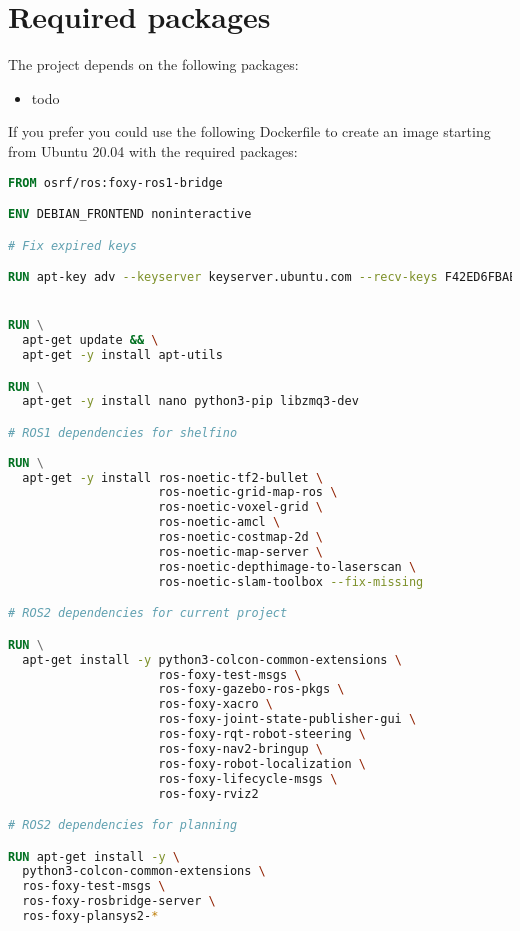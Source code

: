 \chapter{Required packages}

The project depends on the following packages:

\begin{itemize}
    \item todo
\end{itemize}

If you prefer you could use the following Dockerfile to create an image starting from Ubuntu 20.04 with the required packages:

\begin{lstlisting}[language=Dockerfile]
FROM osrf/ros:foxy-ros1-bridge

ENV DEBIAN_FRONTEND noninteractive

# Fix expired keys

RUN apt-key adv --keyserver keyserver.ubuntu.com --recv-keys F42ED6FBAB17C654


RUN \
  apt-get update && \
  apt-get -y install apt-utils

RUN \
  apt-get -y install nano python3-pip libzmq3-dev

# ROS1 dependencies for shelfino
  
RUN \
  apt-get -y install ros-noetic-tf2-bullet \
                     ros-noetic-grid-map-ros \
                     ros-noetic-voxel-grid \
                     ros-noetic-amcl \
                     ros-noetic-costmap-2d \
                     ros-noetic-map-server \
                     ros-noetic-depthimage-to-laserscan \
                     ros-noetic-slam-toolbox --fix-missing

# ROS2 dependencies for current project

RUN \
  apt-get install -y python3-colcon-common-extensions \
                     ros-foxy-test-msgs \
                     ros-foxy-gazebo-ros-pkgs \
                     ros-foxy-xacro \
                     ros-foxy-joint-state-publisher-gui \
                     ros-foxy-rqt-robot-steering \
                     ros-foxy-nav2-bringup \
                     ros-foxy-robot-localization \
                     ros-foxy-lifecycle-msgs \
                     ros-foxy-rviz2

# ROS2 dependencies for planning

RUN apt-get install -y \
  python3-colcon-common-extensions \
  ros-foxy-test-msgs \
  ros-foxy-rosbridge-server \
  ros-foxy-plansys2-*


\end{lstlisting}
